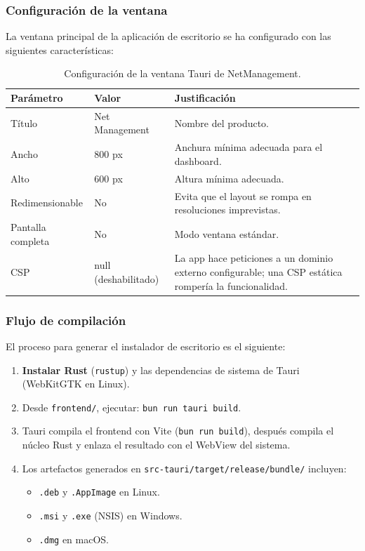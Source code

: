\documentclass[12pt, a4paper, twoside]{article}
\begin{document}
\subsubsection{Configuración de la ventana}

La ventana principal de la aplicación de escritorio se ha configurado con las siguientes características:

\begin{table}[H]
\centering
\begin{tabularx}{\textwidth}{llX}
  \toprule
  \textbf{Parámetro} & \textbf{Valor} & \textbf{Justificación} \\
  \midrule
  Título & Net Management & Nombre del producto. \\
  Ancho & 800 px & Anchura mínima adecuada para el dashboard. \\
  Alto & 600 px & Altura mínima adecuada. \\
  Redimensionable & No & Evita que el layout se rompa en resoluciones imprevistas. \\
  Pantalla completa & No & Modo ventana estándar. \\
  CSP & null (deshabilitado) & La app hace peticiones a un dominio externo configurable; una CSP estática rompería la funcionalidad. \\
  \bottomrule
\end{tabularx}
\caption{Configuración de la ventana Tauri de NetManagement.}
\end{table}

\subsubsection{Flujo de compilación}

El proceso para generar el instalador de escritorio es el siguiente:

\begin{enumerate}
  \item \textbf{Instalar Rust} (\texttt{rustup}) y las dependencias de sistema de Tauri (WebKitGTK en Linux).
  \item Desde \texttt{frontend/}, ejecutar: \texttt{bun run tauri build}.
  \item Tauri compila el frontend con Vite (\texttt{bun run build}), después compila el núcleo Rust y enlaza el resultado con el WebView del sistema.
  \item Los artefactos generados en \texttt{src-tauri/target/release/bundle/} incluyen:
  \begin{itemize}
    \item \texttt{.deb} y \texttt{.AppImage} en Linux.
    \item \texttt{.msi} y \texttt{.exe} (NSIS) en Windows.
    \item \texttt{.dmg} en macOS.
  \end{itemize}
\end{enumerate}
\end{document}
